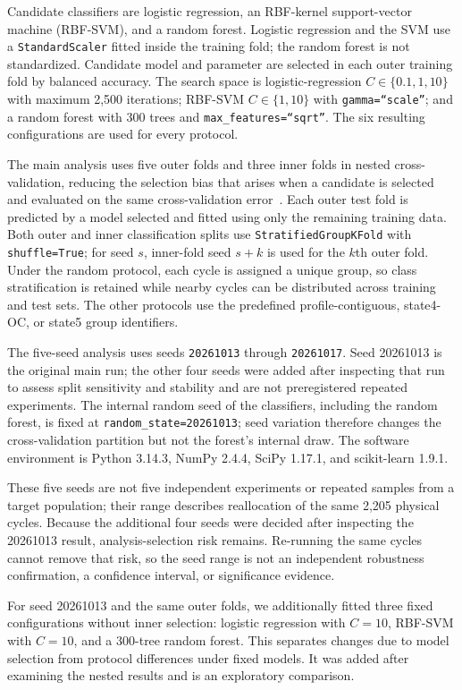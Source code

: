 \documentclass[11pt,a4paper]{article}
\newcommand{\code}[1]{\texttt{#1}}
\begin{document}
Candidate classifiers are logistic regression, an RBF-kernel support-vector machine (RBF-SVM), and a random forest. Logistic regression and the SVM use a \code{StandardScaler} fitted inside the training fold; the random forest is not standardized. Candidate model and parameter are selected in each outer training fold by balanced accuracy. The search space is logistic-regression $C\in\{0.1,1,10\}$ with maximum 2,500 iterations; RBF-SVM $C\in\{1,10\}$ with \code{gamma=``scale''}; and a random forest with 300 trees and \code{max\_features=``sqrt''}. The six resulting configurations are used for every protocol.

The main analysis uses five outer folds and three inner folds in nested cross-validation, reducing the selection bias that arises when a candidate is selected and evaluated on the same cross-validation error~\cite{varma}. Each outer test fold is predicted by a model selected and fitted using only the remaining training data. Both outer and inner classification splits use \code{StratifiedGroupKFold} with \code{shuffle=True}; for seed $s$, inner-fold seed $s+k$ is used for the $k$th outer fold. Under the random protocol, each cycle is assigned a unique group, so class stratification is retained while nearby cycles can be distributed across training and test sets. The other protocols use the predefined profile-contiguous, state4-OC, or state5 group identifiers.

The five-seed analysis uses seeds \code{20261013} through \code{20261017}. Seed 20261013 is the original main run; the other four seeds were added after inspecting that run to assess split sensitivity and stability and are not preregistered repeated experiments. The internal random seed of the classifiers, including the random forest, is fixed at \code{random\_state=20261013}; seed variation therefore changes the cross-validation partition but not the forest's internal draw. The software environment is Python 3.14.3, NumPy 2.4.4, SciPy 1.17.1, and scikit-learn 1.9.1.
\par
These five seeds are not five independent experiments or repeated samples from a target population; their range describes reallocation of the same 2,205 physical cycles. Because the additional four seeds were decided after inspecting the 20261013 result, analysis-selection risk remains. Re-running the same cycles cannot remove that risk, so the seed range is not an independent robustness confirmation, a confidence interval, or significance evidence.

For seed 20261013 and the same outer folds, we additionally fitted three fixed configurations without inner selection: logistic regression with $C=10$, RBF-SVM with $C=10$, and a 300-tree random forest. This separates changes due to model selection from protocol differences under fixed models. It was added after examining the nested results and is an exploratory comparison.
\end{document}
